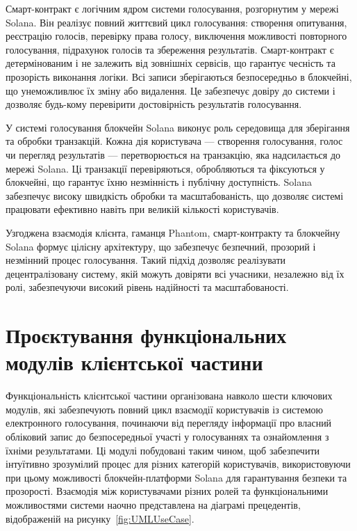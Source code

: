 \documentclass[14pt]{extreport}
\begin{document}
  Смарт-контракт є логічним ядром системи голосування, розгорнутим у мережі Solana. Він реалізує повний життєвий цикл голосування: створення опитування, реєстрацію голосів, перевірку права голосу, виключення можливості повторного голосування, підрахунок голосів та збереження результатів. Смарт-контракт є детермінованим і не залежить від зовнішніх сервісів, що гарантує чесність та прозорість виконання логіки. Всі записи зберігаються безпосередньо в блокчейні, що унеможливлює їх зміну або видалення. Це забезпечує довіру до системи і дозволяє будь-кому перевірити достовірність результатів голосування.

  У системі голосування блокчейн Solana виконує роль середовища для зберігання та обробки транзакцій. Кожна дія користувача — створення голосування, голос чи перегляд результатів — перетворюється на транзакцію, яка надсилається до мережі Solana. Ці транзакції перевіряються, обробляються та фіксуються у блокчейні, що гарантує їхню незмінність і публічну доступність. Solana забезпечує високу швидкість обробки та масштабованість, що дозволяє системі працювати ефективно навіть при великій кількості користувачів.

  Узгоджена взаємодія клієнта, гаманця Phantom, смарт-контракту та блокчейну Solana формує цілісну архітектуру, що забезпечує безпечний, прозорий і незмінний процес голосування. Такий підхід дозволяє реалізувати децентралізовану систему, якій можуть довіряти всі учасники, незалежно від їх ролі, забезпечуючи високий рівень надійності та масштабованості.
  
  \section{Проєктування функціональних модулів клієнтської частини}
  
  Функціональність клієнтської частини організована навколо шести ключових модулів, які забезпечують повний цикл взаємодії користувачів із системою електронного голосування, починаючи від перегляду інформації про власний обліковий запис до безпосередньої участі у голосуваннях та ознайомлення з їхніми результатами. Ці модулі побудовані таким чином, щоб забезпечити інтуїтивно зрозумілий процес для різних категорій користувачів, використовуючи при цьому можливості блокчейн-платформи Solana для гарантування безпеки та прозорості. Взаємодія між користувачами різних ролей та функціональними можливостями системи наочно представлена на діаграмі прецедентів, відображеній на рисунку~\ref{fig:UMLUseCase}.
\end{document}
